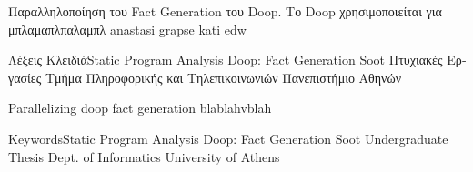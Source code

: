 \documentclass{dithesis}
\renewcommand{\university}{National and Kapodistrian University of Athens}
\renewcommand{\school}{School of Science}
\renewcommand{\department}{Department of Informatics and Telecommunications}
\renewcommand{\thesisplace}{Athens}
\renewcommand{\thesisdate}{July 2016}
\renewcommand{\thesislabel}{Undergraduate Thesis}
\renewcommand{\supervisorlabel}{Supervisors}
\renewcommand{\idlabel}{R.N.}
\begin{document}
\begin{otherlanguage}{english}
\maketitle
\setcounter{page}{3}
\end{otherlanguage}


\begin{otherlanguage}{greek}
\renewcommand{\university}{Εθνικό και Καποδιστριακό Πανεπιστήμιο Αθηνών}
\renewcommand{\school}{Σχολή Θετικών Επιστημών}
\renewcommand{\department}{Τμήμα Πληροφορικής και Τηλεπικοινωνιών}
\renewcommand{\thesisplace}{Αθήνα}
\renewcommand{\thesisdate}{Ιούλιος 2016}
\renewcommand{\thesislabel}{Πτυχιακή Εργασία}
\renewcommand{\supervisorlabel}{Επιβλέποντες}
\renewcommand{\idlabel}{Α.Μ.}
\let\thesupervisorslist\undefined
{}
\maketitlesecond
\end{otherlanguage}


\begin{otherlanguage}{greek}
\begin{thesisabstract}[ΠΕΡΙΛΗΨΗ]
    Παραλληλοποίηση του Fact Generation του Doop. Το Doop χρησιμοποιείται για μπλαμαπλπαλαμπλ anastasi grapse kati edw

                {Λέξεις Κλειδιά}{Static Program Analysis}
                                {Doop: Fact Generation}
                                {Soot}
                                {Πτυχιακές Εργασίες}
                                {Τμήμα Πληροφορικής και Τηλεπικοινωνιών}
                                {Πανεπιστήμιο Αθηνών}
\end{thesisabstract}
\end{otherlanguage}

\begin{thesisabstract}[ABSTRACT]
    Parallelizing doop fact generation blablahvblah

                {Keywords}{Static Program Analysis}
                            {Doop: Fact Generation}
                            {Soot}
                            {Undergraduate Thesis}
                            {Dept. of Informatics}
                            {University of Athens}
\end{thesisabstract}
\end{document}
